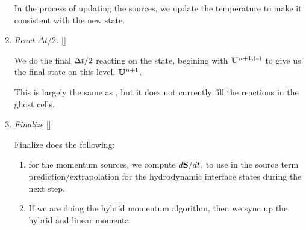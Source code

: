 \begin{enumerate}
  In the process of updating the sources, we update the temperature to
  make it consistent with the new state.






\item {\em React $\Delta t/2$.} []

  We do the final $\Delta t/2$ reacting on the state, begining with ${\bf U}^{n+1,(c)}$ to
  give us the final state on this level, ${\bf U}^{n+1}$.

  This is largely the same as , but
  it does not currently fill the reactions in the ghost cells. 

\item \label{strang:finalize} {\em Finalize} []

  Finalize does the following:
  \begin{enumerate}
  \item for the momentum sources, we compute $d{\bf S}/dt$, to use in the
    source term prediction/extrapolation for the hydrodynamic
    interface states during the next step.

  \item If we are doing the hybrid momentum algorithm, then we sync up
    the hybrid and linear momenta
  \end{enumerate}

\end{enumerate}

